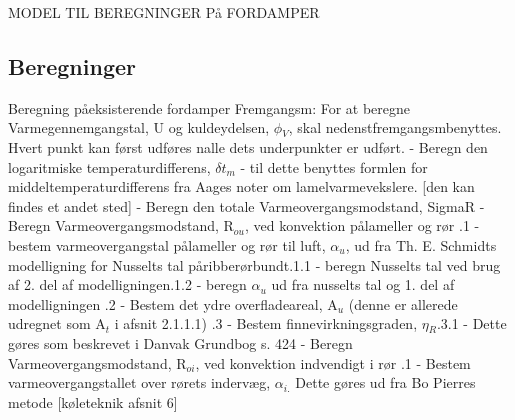 \documentclass[../Hovedrapport.tex]{subfiles}
\begin{document}
MODEL TIL BEREGNINGER På FORDAMPER

\subsection*{Beregninger}

\vspace{0.10in}
\noindent
\rm Beregning p\aa eksisterende fordamper\newline
 \newline
 Fremgangsm\aade:\newline
 \newline
For at beregne Varmegennemgangstal, U og kuldeydelsen, $\phi$$_{V}$, skal nedenst\aaende fremgangsm\aade benyttes.\newline
Hvert punkt kan først udføres n\aar alle dets underpunkter er udført.\newline
 \newline
  - Beregn den logaritmiske temperaturdifferens, ${\delta t}$$_{m}$\newline
  - til dette benyttes formlen for middeltemperaturdifferens fra Aages noter om lamelvarmevekslere. [den kan findes et andet sted]\newline
 \newline
  - Beregn den totale Varmeovergangsmodstand, SigmaR\newline
  - Beregn Varmeovergangsmodstand, R$_{ou}$, ved konvektion p\aa lameller og rør\newline
 .1 - bestem varmeovergangstal p\aa lameller og rør til luft, $\alpha$$_{u}$, ud fra Th. E. Schmidts modelligning for Nusselts tal p\aa ribberørbundt.1.1 - beregn Nusselts tal ved brug af 2. del af modelligningen.1.2 - beregn $\alpha$$_{u}$ ud fra nusselts tal og 1. del af modelligningen\newline
 .2 - Bestem det ydre overfladeareal, A$_{u}$ (denne er allerede udregnet som A$_{t}$ i afsnit 2.1.1.1)\newline
 .3 - Bestem finnevirkningsgraden, $\eta$$_{R}$.3.1 - Dette gøres som beskrevet i Danvak Grundbog s. 424\newline
 \newline
  - Beregn Varmeovergangsmodstand, R$_{oi}$, ved konvektion indvendigt i rør\newline
 .1 - Bestem varmeovergangstallet over rørets indervæg, $\alpha$$_{i.}$ Dette gøres ud fra Bo Pierres metode [køleteknik afsnit 6]\newline
\end{document}
